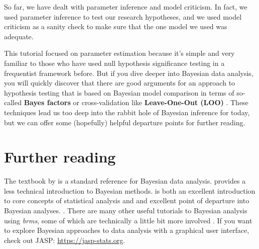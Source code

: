 \documentclass[nobib]{tufte-handout}
\begin{document}
So far, we have dealt with parameter inference and model criticism. In fact, we used parameter inference to test our research hypotheses, and we used model criticism as a sanity check to
make sure that the one model we used was adequate.

This tutorial focused on parameter estimation because it's simple and very familiar to those
who have used null hypothesis significance testing in a frequentist framework before. But if
you dive deeper into Bayesian data analysis, you will quickly discover that there are good
arguments \citep[e.g.][]{VandekerckhoveMatzke2015:Model-Compariso} for an approach to
hypothesis testing that is based on Bayesian model comparison in terms of so-called
\textbf{Bayes factors} \citep{Jeffreys1961:Theory-of-Proba,KassRaftery1995:Bayes-Factors} or
cross-validation like \textbf{Leave-One-Out (LOO)} \citep{VehtariGelman2016:Practical-Bayes}.
These techniques lead us too deep into the rabbit hole of Bayesian inference for today, but we
can offer some (hopefully) helpful departure points for further reading.

\section{Further reading}

The textbook by \citet{GelmanCarlin2014:Bayesian-Data-A} is a standard reference for Bayesian
data analysis. \citet{Kruschke2011:Doing-Bayesian-} provides a less technical introduction to
Bayesian methods. \citet{McElreath2016:Statistical-Ret} is both an excellent introduction to
core concepts of statistical analysis and and excellent point of departure into Bayesian
analyses.
%
.
There are many other useful tutorials to Bayesian analysis using \emph{brms}, some of which are
technically a little bit more involved \citep[e.g.][]{SorensenHohensteinb2016:Bayesian-linear}.
If you want to explore Bayesian approaches to data analysis with a graphical user interface, check out JASP: \url{https://jasp-stats.org}. 








\printbibliography[heading=bibintoc]
\end{document}
